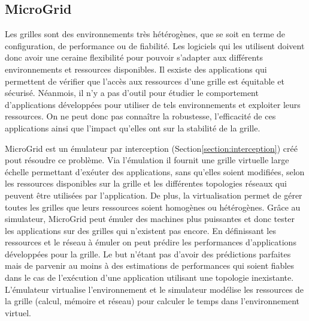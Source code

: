 \subsection{MicroGrid}

Les grilles sont des environnements très hétérogènes, que se soit en terme de configuration, de performance ou de fiabilité. Les logiciels qui les utilisent doivent donc avoir une ceraine flexibilité pour pouvoir s'adapter aux différents environnements et ressources disponibles. Il esxiste des applications qui permettent de vérifier que l'accès aux ressources d'une grille est équitable et sécurisé. Néanmois, il n'y a pas d'outil pour étudier le comportement d'applications développées pour utiliser de tels environnements et exploiter leurs ressources. On ne peut donc pas connaître la robustesse, l'efficacité de ces applications ainsi que l'impact qu'elles ont sur la stabilité de la grille. 

MicroGrid \citep{MICROGRID_INIT, MICROGRID_CASANOVA} est un émulateur par interception (Section\ref{section:interception}) créé pout résoudre ce problème. Via l'émulation il fournit une grille virtuelle large échelle permettant d'exéuter des applications, sans qu'elles soient modifiées, selon les ressources disponibles sur la grille et les différentes topologies réseaux qui peuvent être utilisées par l'application. De plus, la virtualisation permet de gérer toutes les grilles que leurs ressources soient homogènes ou hétérogènes. Grâce au simulateur, %
MicroGrid peut émuler des machines plus puissantes et donc tester les applications sur des grilles qui n'existent pas encore. En définissant les ressources et le réseau à émuler on peut prédire les performances d'applications développées pour la grille. Le but n'étant pas d'avoir des prédictions parfaites mais de parvenir au moins à des estimations de performances qui soient fiables dans le cas de l'exécution d'une application utilisant une topologie inexistante. L'émulateur virtualise l'environnement et le simulateur modélise les ressources de la grille (calcul, mémoire et réseau) pour calculer le temps dans l'environnement virtuel.

